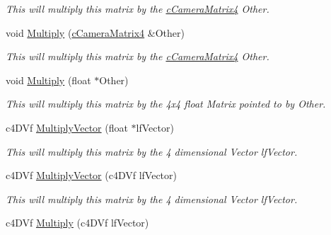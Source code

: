 \begin{DoxyCompactItemize}
\begin{DoxyCompactList}\small\item\em This will multiply this matrix by the \hyperlink{classc_camera_matrix4}{cCameraMatrix4} Other. \end{DoxyCompactList}\item 
\hypertarget{classc_matrix4_a8cd8d9304a6bc454d635c2e37f340fa7}{
void \hyperlink{classc_matrix4_a8cd8d9304a6bc454d635c2e37f340fa7}{Multiply} (\hyperlink{classc_camera_matrix4}{cCameraMatrix4} \&Other)}
\label{classc_matrix4_a8cd8d9304a6bc454d635c2e37f340fa7}

\begin{DoxyCompactList}\small\item\em This will multiply this matrix by the \hyperlink{classc_camera_matrix4}{cCameraMatrix4} Other. \end{DoxyCompactList}\item 
\hypertarget{classc_matrix4_a67be2f0c0552a8c88ccd25e6fe4c3e4e}{
void \hyperlink{classc_matrix4_a67be2f0c0552a8c88ccd25e6fe4c3e4e}{Multiply} (float $\ast$Other)}
\label{classc_matrix4_a67be2f0c0552a8c88ccd25e6fe4c3e4e}

\begin{DoxyCompactList}\small\item\em This will multiply this matrix by the 4x4 float Matrix pointed to by Other. \end{DoxyCompactList}\item 
\hypertarget{classc_matrix4_a48bd924892489442e2b123f9748b2fd4}{
c4DVf \hyperlink{classc_matrix4_a48bd924892489442e2b123f9748b2fd4}{MultiplyVector} (float $\ast$lfVector)}
\label{classc_matrix4_a48bd924892489442e2b123f9748b2fd4}

\begin{DoxyCompactList}\small\item\em This will multiply this matrix by the 4 dimensional Vector lfVector. \end{DoxyCompactList}\item 
\hypertarget{classc_matrix4_a0ea7f1ee83288bfc09db32d5939f18b1}{
c4DVf \hyperlink{classc_matrix4_a0ea7f1ee83288bfc09db32d5939f18b1}{MultiplyVector} (c4DVf lfVector)}
\label{classc_matrix4_a0ea7f1ee83288bfc09db32d5939f18b1}

\begin{DoxyCompactList}\small\item\em This will multiply this matrix by the 4 dimensional Vector lfVector. \end{DoxyCompactList}\item 
\hypertarget{classc_matrix4_a04a7a29ceff673479de7500fbfe332ae}{
c4DVf \hyperlink{classc_matrix4_a04a7a29ceff673479de7500fbfe332ae}{Multiply} (c4DVf lfVector)}
\label{classc_matrix4_a04a7a29ceff673479de7500fbfe332ae}


\end{DoxyCompactItemize}
